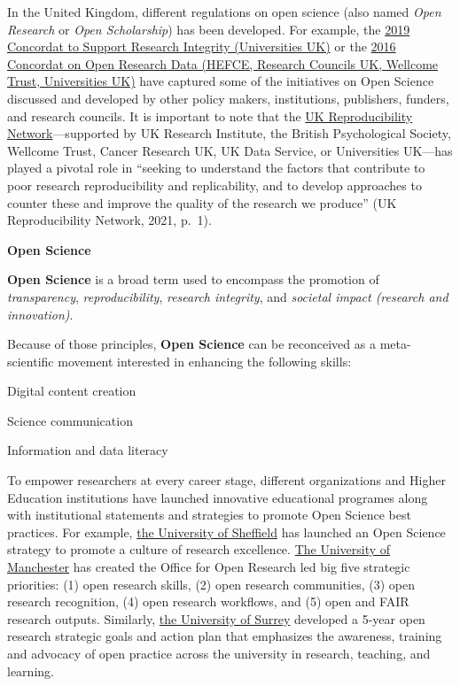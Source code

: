 \documentclass[
]{book}
\theoremstyle{definition}
\theoremstyle{definition}
\theoremstyle{definition}
\theoremstyle{definition}
\theoremstyle{remark}
\begin{document}
In the United Kingdom, different regulations on open science (also named \emph{Open Research} or \emph{Open Scholarship}) has been developed. For example, the \href{https://www.universitiesuk.ac.uk/topics/research-and-innovation/concordat-support-research-integrity}{2019 Concordat to Support Research Integrity (Universities UK)} or the \href{https://www.ukri.org/wp-content/uploads/2020/10/UKRI-020920-ConcordatonOpenResearchData.pdf}{2016 Concordat on Open Research Data (HEFCE, Research Councils UK, Wellcome Trust, Universities UK)} have captured some of the initiatives on Open Science discussed and developed by other policy makers, institutions, publishers, funders, and research councils. It is important to note that the \href{https://www.ukrn.org}{UK Reproducibility Network}---supported by UK Research Institute, the British Psychological Society, Wellcome Trust, Cancer Research UK, UK Data Service, or Universities UK---has played a pivotal role in ``seeking to understand the factors that contribute to poor research reproducibility and replicability, and to develop approaches to counter these and improve the quality of the research we produce'' (UK Reproducibility Network, 2021, p.~1).

\textbf{Open Science}

\textbf{Open Science} is a broad term used to encompass the promotion of \emph{transparency}, \emph{reproducibility}, \emph{research integrity}, and \emph{societal impact (research and innovation)}.

Because of those principles, \textbf{Open Science} can be reconceived as a meta-scientific movement interested in enhancing the following skills:

Digital content creation

Science communication

Information and data literacy

To empower researchers at every career stage, different organizations and Higher Education institutions have launched innovative educational programes along with institutional statements and strategies to promote Open Science best practices. For example, \href{https://www.sheffield.ac.uk/openresearch/university-statement-open-research}{the University of Sheffield} has launched an Open Science strategy to promote a culture of research excellence. \href{https://www.openresearch.manchester.ac.uk}{The University of Manchester} has created the Office for Open Research led big five strategic priorities: (1) open research skills, (2) open research communities, (3) open research recognition, (4) open research workflows, and (5) open and FAIR research outputs. Similarly, \href{https://www.surrey.ac.uk/sites/default/files/2022-02/open-research-strategic-goals-and-action-plan-2019-2024.pdf}{the University of Surrey} developed a 5-year open research strategic goals and action plan that emphasizes the awareness, training and advocacy of open practice across the university in research, teaching, and learning.
\end{document}
